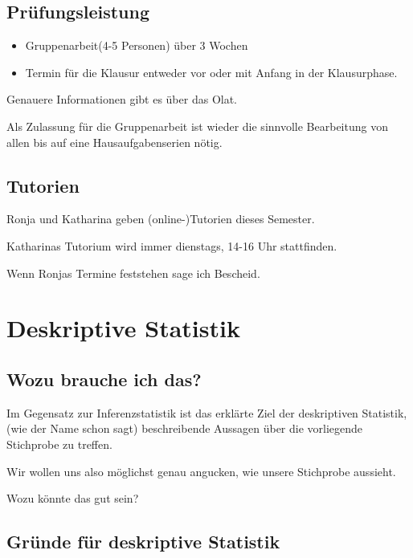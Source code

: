 \documentclass[
]{book}
\begin{document}
\hypertarget{pruxfcfungsleistung-1}{%
\subsection{Prüfungsleistung}\label{pruxfcfungsleistung-1}}

\begin{itemize}
\item
  Gruppenarbeit(4-5 Personen) über 3 Wochen
\item
  Termin für die Klausur entweder vor oder mit Anfang in der Klausurphase.
\end{itemize}

Genauere Informationen gibt es über das Olat.

Als Zulassung für die Gruppenarbeit ist wieder die sinnvolle Bearbeitung von allen bis auf eine Hausaufgabenserien nötig.

\hypertarget{tutorien}{%
\subsection{Tutorien}\label{tutorien}}

Ronja und Katharina geben (online-)Tutorien dieses Semester.

Katharinas Tutorium wird immer dienstags, 14-16 Uhr stattfinden.

Wenn Ronjas Termine feststehen sage ich Bescheid.

\hypertarget{deskriptive-statistik}{%
\section{Deskriptive Statistik}\label{deskriptive-statistik}}

\hypertarget{wozu-brauche-ich-das}{%
\subsection{Wozu brauche ich das?}\label{wozu-brauche-ich-das}}

Im Gegensatz zur Inferenzstatistik ist das erklärte Ziel der deskriptiven Statistik, (wie der Name schon sagt) beschreibende Aussagen über die vorliegende Stichprobe zu treffen.

Wir wollen uns also möglichst genau angucken, wie unsere Stichprobe aussieht.

Wozu könnte das gut sein?

\hypertarget{gruxfcnde-fuxfcr-deskriptive-statistik}{%
\subsection{Gründe für deskriptive Statistik}\label{gruxfcnde-fuxfcr-deskriptive-statistik}}
\end{document}
